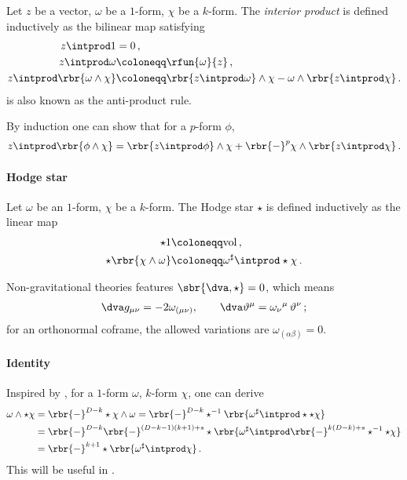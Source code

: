 \documentclass[a4paper]{article}
\begin{document}
Let $z$ be a vector, $\omega$ be a $1$-form, $\chi$ be a $k$-form. 
The \emph{interior product} is defined inductively as the bilinear map
satisfying
\begin{align}
z \intprod 1 &= 0\,,
\\
z \intprod \omega &\coloneqq \rfun{\omega}{z}\,,
\\
z \intprod \rbr{\omega \wedge \chi} &\coloneqq
	\rbr{z\intprod\omega}\wedge \chi - \omega \wedge \rbr{z\intprod \chi}\,.
\label{eq:anti-prod-100}
\end{align}
 is also known as the anti-product rule.

By induction one can show that for a $p$-form $\phi$,
\begin{align}
z \intprod \rbr{\phi \wedge \chi} =
	\rbr{z\intprod\phi}\wedge \chi +
		\rbr{-}^{p} \chi \wedge \rbr{z\intprod \chi}\,.
\end{align}

\paragraph{Hodge star}

Let $\omega$ be an $1$-form, $\chi$ be a $k$-form. The Hodge star
$\star$ is defined inductively as the linear map 
\begin{align}
\star 1 &\coloneqq \mathrm{vol}\,, \\
\star\rbr{\chi\wedge\omega} &\coloneqq \omega^{\sharp} \intprod \star\chi\,.
\label{eq:hodge-100}
\end{align}

Non-gravitational theories features $\sbr{\dva, \star} = 0$, which means
\cite[sec.\ 3.2]{Muench1998}
\begin{align}
\dva g_{\mu\nu} = -2\omega_{(\mu\nu)},\qquad 
\dva\vartheta^{\mu} = \omega_{\nu}{}^{\mu}\,\vartheta^{\nu}\,;
\end{align}
for an orthonormal coframe, the allowed variations are 
$\omega_{(\alpha\beta)} = 0$.


\paragraph{Identity}

Inspired by \cite[eq.\ (3.167)]{Straumann2013}, for a $1$-form $\omega$,
$k$-form $\chi$, one can derive
\begin{align}
\omega\wedge\star\chi &= \rbr{-}^{D-k}\star\chi\wedge\omega
= \rbr{-}^{D-k} \star^{-1}
	\rbr{\omega^\sharp\intprod\star\star\chi}
\nonumber \\
&= \rbr{-}^{D-k} \rbr{-}^{(D-k-1)(k+1)+s}\star
	\rbr{\omega^\sharp\intprod \rbr{-}^{k(D-k)+s}
		\star^{-1}\star\chi }
\nonumber \\
&= \rbr{-}^{k+1} \star\rbr{\omega^\sharp\intprod \chi }\,.
\label{eq:ident-10}
\end{align}
This will be useful in .
\end{document}
